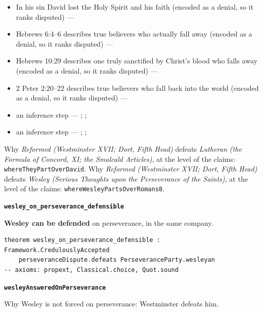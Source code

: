 \documentclass[11pt]{article}
\begin{document}
\begin{itemize}
\begin{itemize}
\item In his sin David lost the Holy Spirit and his faith (encoded as a denial, so it ranks disputed) --- \cite[299--300]{calvin-psalms-2-1846}
\item Hebrews 6:4–6 describes true believers who actually fall away (encoded as a denial, so it ranks disputed) --- \cite[137--138]{calvin-hebrews-1853}
\item Hebrews 10:29 describes one truly sanctified by Christ’s blood who falls away (encoded as a denial, so it ranks disputed) --- \cite[545--546]{owen-works-23-1855}
\item 2 Peter 2:20–22 describes true believers who fall back into the world (encoded as a denial, so it ranks disputed) --- \cite[410--412]{calvin-commentaries-catholic-epistles}
\item an inference step --- \cite[444--445]{wesley-works-9-1827}; \cite[415--416]{calvin-commentary-john-1847}; \cite[Solid Declaration XI.45]{concordia-triglotta-1921}
\item an inference step --- \cite[Trent, Session VI (1547), ch. 13]{tanner-decrees-1990}; \cite[40]{waterworth-trent-1848}; \cite[Solid Declaration XI.42]{concordia-triglotta-1921}
\end{itemize}
\end{itemize}
\noindent Why \emph{Reformed (Westminster XVII; Dort, Fifth Head)} defeats \emph{Lutheran (the Formula of Concord, XI; the Smalcald Articles)}, at the level of the claims: \texttt{where\allowbreak{}They\allowbreak{}Part\allowbreak{}Over\allowbreak{}David}.
\noindent Why \emph{Reformed (Westminster XVII; Dort, Fifth Head)} defeats \emph{Wesley (Serious Thoughts upon the Perseverance of the Saints)}, at the level of the claims: \texttt{where\allowbreak{}Wesley\allowbreak{}Parts\allowbreak{}Over\allowbreak{}Romans8}.
\par\medskip\noindent\textbf{\texttt{wesley\_\allowbreak{}on\_\allowbreak{}perseverance\_\allowbreak{}defensible}}\par\nobreak\noindent
\textbf{Wesley can be defended} on perseverance, in the same company.

{\small\begin{verbatim}
theorem wesley_on_perseverance_defensible : Framework.CredulouslyAccepted
    perseveranceDispute.defeats PerseveranceParty.wesleyan
-- axioms: propext, Classical.choice, Quot.sound
\end{verbatim}}
\par\medskip\noindent\textbf{\texttt{wesley\allowbreak{}Answered\allowbreak{}On\allowbreak{}Perseverance}}\par\nobreak\noindent
Why Wesley is not forced on perseverance: Westminster defeats him.
\end{document}
